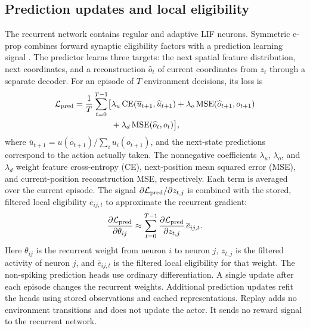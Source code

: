 \subsection{Prediction updates and local eligibility}
The recurrent network contains regular and adaptive LIF neurons. Symmetric e-prop combines forward synaptic eligibility factors with a prediction learning signal \cite{bellec2020}. The predictor learns three targets: the next spatial feature distribution, next coordinates, and a reconstruction $\widehat o_t$ of current coordinates from $z_t$ through a separate decoder. For an episode of $T$ environment decisions, its loss is
\begin{equation}
 \begin{aligned}
 \mathcal L_{\rm pred}=\frac{1}{T}\sum_{t=0}^{T-1}\bigl[&\lambda_u\operatorname{CE}(\overline u_{t+1},\widehat u_{t+1})
 +\lambda_o\operatorname{MSE}(\widehat o_{t+1},o_{t+1})\\
 &+\lambda_d\operatorname{MSE}(\widehat o_t,o_t)\bigr],
 \end{aligned}
\end{equation}
where $\overline u_{t+1}=u(o_{t+1})/\sum_i u_i(o_{t+1})$, and the next-state predictions correspond to the action actually taken. The nonnegative coefficients $\lambda_u$, $\lambda_o$, and $\lambda_d$ weight feature cross-entropy (CE), next-position mean squared error (MSE), and current-position reconstruction MSE, respectively. Each term is averaged over the current episode. The signal $\partial\mathcal L_{\rm pred}/\partial z_{t,j}$ is combined with the stored, filtered local eligibility $\overline e_{ij,t}$ to approximate the recurrent gradient:
\begin{equation}
 \frac{\partial\mathcal L_{\rm pred}}{\partial\theta_{ij}}
 \approx\sum_{t=0}^{T-1}\frac{\partial\mathcal L_{\rm pred}}{\partial z_{t,j}}\,\overline e_{ij,t}.
\end{equation}
Here $\theta_{ij}$ is the recurrent weight from neuron $i$ to neuron $j$, $z_{t,j}$ is the filtered activity of neuron $j$, and $\overline e_{ij,t}$ is the filtered local eligibility for that weight. The non-spiking prediction heads use ordinary differentiation. A single update after each episode changes the recurrent weights. Additional prediction updates refit the heads using stored observations and cached representations. Replay adds no environment transitions and does not update the actor. It sends no reward signal to the recurrent network.

